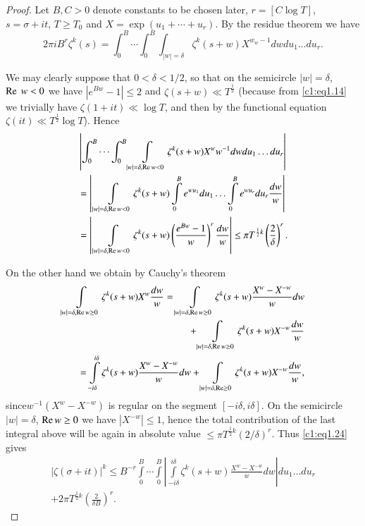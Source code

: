 \begin{proof}
  Let $B, C > 0$ denote constants to be chosen later, $r= [C \log T]$,
  $s= \sigma + it $, $T \geq T_0$ and $X = \exp (u_1+ \cdots +
  u_r)$. By the residue theorem we have
  \begin{equation}
    2 \pi i B^r \zeta^k (s)= \int^B_0\cdots \int^B_0 \int_{|w|=\delta}
    \zeta^k (s + w) X^{w_w-1} dw du_1 \ldots du_r.\label{c1:eq1.24}
  \end{equation}

We may clearly suppose that $0<\delta < 1/2$, so that on the
semicircle $|w| = \delta$, $\operatorname{Re} \; w < 0$ we have $|e^{Bw} -1| \leq 2$ and
$\zeta (s+w)\ll T^{\frac{1}{2}}$ (because from \eqref{c1:eq1.14} we
trivially have $\zeta (1+ it ) \ll \log T$, and then by the
functional equation $\zeta (it )\ll T^{\frac{1}{2}} \log
  T$). Hence
\begin{align*}
  & \left|\int^B_0 \cdots \int_0^B \int\limits_{|w| = \delta, \operatorname{Re} w < 0}
  \zeta^k (s+w) X^{w} w^{-1} dw du_1 \ldots du_r \right|\\
  &=  \left| ~\int\limits_{|w|= \delta, \operatorname{Re} w < 0} \zeta^k (s+w)
  \int\limits_0^B  e^{wu_1} du_1 \ldots \int\limits^B_0 e^{wu_r} du_r
  \frac{dw}{w} \right|\\
  &= \left| ~\int\limits_{|w| =  \delta, \operatorname{Re} w < 0} \zeta^k (s+w)
  \left( \frac{e^{Bw}-1}{w}\right)^r \frac{dw}{w} \right| \leq \pi
  T^{\frac{1}{2}k} \left(\frac{2}{\delta} \right)^r.
\end{align*}

On the other hand we obtain by Cauchy's theorem
\begin{align*}
  \int\limits_{|w|= \delta, \operatorname{Re} w \geq 0} \zeta^k (s+w) X^w \frac{dw}{w}
  = \int\limits_{|w| = \delta, \operatorname{Re} w \geq 0} \zeta^k (s+w)\frac{X^w -
    X^{-w}}{w} dw\\
  + \int\limits_{|w| = \delta, \operatorname{Re} w \geq 0} \zeta^k (s+w)X^{-w}
  \frac{dw}{w}\\
  = \int\limits_{- i\delta}^{i \delta} \zeta^k (s + w) \frac{X^w -
    X^{-w}}{w} dw + \int\limits_{|w| = \delta, \operatorname{Re} \geq 0} \zeta^k
  (s+w) X^{-w} \frac{dw}{w},
\end{align*}
since\pageoriginale $w^{-1} (X^w - X^{-w})$ is regular on the segment $[- i \delta, i
\delta]$. On the semicircle $|w| = \delta$, $\operatorname{Re} w \geq 0$ we have
$|X^{-w}| \leq 1$, hence the total contribution of the last integral
above will be again in absolute value $\leq \pi T^{\frac{1}{2} k}
(2/\delta)^r$. Thus \eqref{c1:eq1.24} gives 
\begin{multline*}
|\zeta (\sigma + it )|^k \leq B^{-r} \int\limits^B_0 \cdots
\int\limits^B_0 \left| \int\limits_{- i \delta}^{i \delta} \zeta^k
(s+w) \frac{X^w - X^{-w}}{w} dw \right| du_1 \ldots du_r\\ 
+ 2 \pi T^{\frac{1}{2} k} \left(\frac{2}{\delta B} \right)^r.
\end{multline*}


\end{proof}
